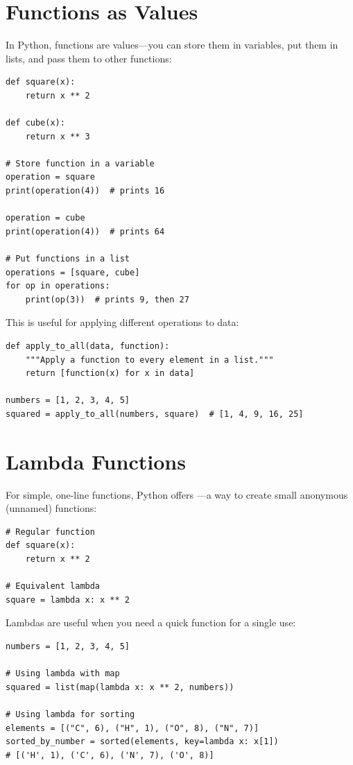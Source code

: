 \section{Functions as Values}
\label{sec:functions-as-values}

In Python, functions are values---you can store them in variables, put them in lists, and pass them to other functions:

\begin{lstlisting}
def square(x):
    return x ** 2

def cube(x):
    return x ** 3

# Store function in a variable
operation = square
print(operation(4))  # prints 16

operation = cube
print(operation(4))  # prints 64

# Put functions in a list
operations = [square, cube]
for op in operations:
    print(op(3))  # prints 9, then 27
\end{lstlisting}

This is useful for applying different operations to data:

\begin{lstlisting}
def apply_to_all(data, function):
    """Apply a function to every element in a list."""
    return [function(x) for x in data]

numbers = [1, 2, 3, 4, 5]
squared = apply_to_all(numbers, square)  # [1, 4, 9, 16, 25]
\end{lstlisting}

\section{Lambda Functions}
\label{sec:lambda}

For simple, one-line functions, Python offers ---a way to create small anonymous (unnamed) functions:

\begin{lstlisting}
# Regular function
def square(x):
    return x ** 2

# Equivalent lambda
square = lambda x: x ** 2
\end{lstlisting}

Lambdas are useful when you need a quick function for a single use:

\begin{lstlisting}
numbers = [1, 2, 3, 4, 5]

# Using lambda with map
squared = list(map(lambda x: x ** 2, numbers))

# Using lambda for sorting
elements = [("C", 6), ("H", 1), ("O", 8), ("N", 7)]
sorted_by_number = sorted(elements, key=lambda x: x[1])
# [('H', 1), ('C', 6), ('N', 7), ('O', 8)]
\end{lstlisting}

